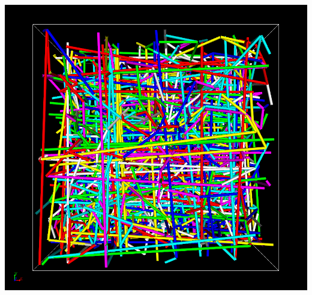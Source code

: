 \documentclass[12pt, dvipdfmx]{beamer}
\begin{document}
\begin{frame}
\begin{columns}[onlytextwidth]
			\vspace{2mm}
				\includegraphics[width=.8\textwidth]{z_cord_4Chain.png}
	\end{columns}
\end{frame}
\end{document}
